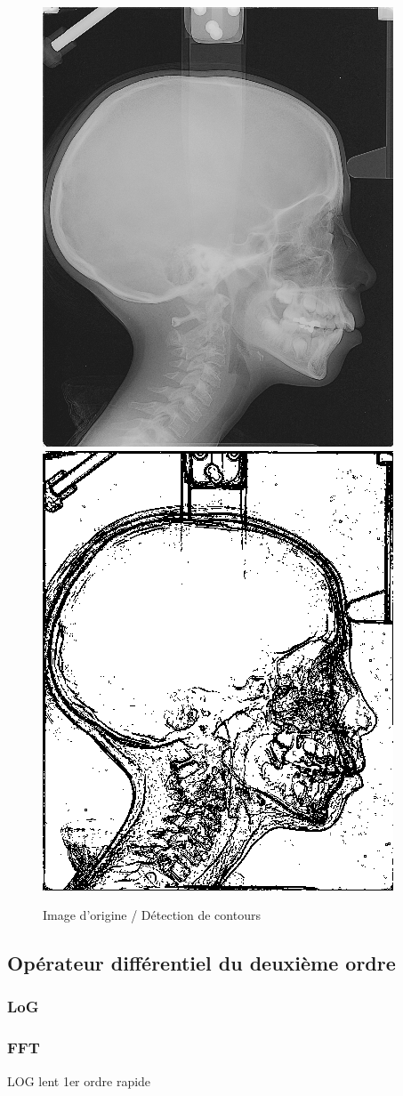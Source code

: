 \documentclass[paper=a4, fontsize=11pt]{scrartcl} %
\begin{document}
\begin{figure} [h!]
\caption{Image d'origine / Détection de contours}
\label{Contour1ordre}
\includegraphics[scale=0.5]{images/rapport/radio1.png} 
\includegraphics[scale=0.5]{images/rapport/coucou1.png} 
\end{figure}



\subsection{Opérateur différentiel du deuxième ordre}
\subsubsection{LoG}
\subsubsection{FFT}



LOG lent 1er ordre rapide
\end{document}
